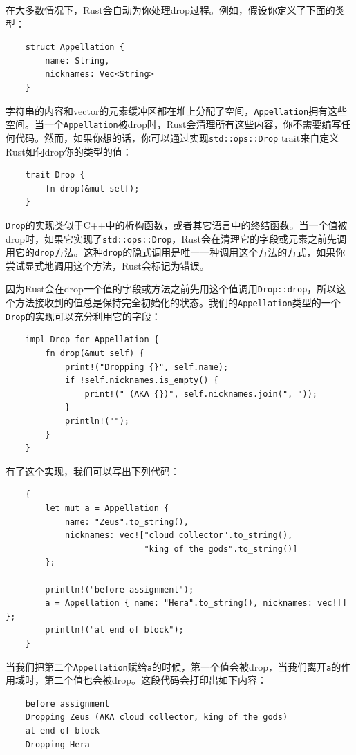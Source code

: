 在大多数情况下，Rust会自动为你处理drop过程。例如，假设你定义了下面的类型：
\begin{verbatim}
    struct Appellation {
        name: String,
        nicknames: Vec<String>
    }
\end{verbatim}

字符串的内容和vector的元素缓冲区都在堆上分配了空间，\texttt{Appellation}拥有这些空间。当一个\texttt{Appellation}被drop时，Rust会清理所有这些内容，你不需要编写任何代码。然而，如果你想的话，你可以通过实现\texttt{std::ops::Drop} trait来自定义Rust如何drop你的类型的值：
\begin{verbatim}
    trait Drop {
        fn drop(&mut self);
    }
\end{verbatim}

\texttt{Drop}的实现类似于C++中的析构函数，或者其它语言中的终结函数。当一个值被drop时，如果它实现了\texttt{std::ops::Drop}，Rust会在清理它的字段或元素之前先调用它的\texttt{drop}方法。这种\texttt{drop}的隐式调用是唯一一种调用这个方法的方式，如果你尝试显式地调用这个方法，Rust会标记为错误。

因为Rust会在drop一个值的字段或方法之前先用这个值调用\texttt{Drop::drop}，所以这个方法接收到的值总是保持完全初始化的状态。我们的\texttt{Appellation}类型的一个\texttt{Drop}的实现可以充分利用它的字段：
\begin{verbatim}
    impl Drop for Appellation {
        fn drop(&mut self) {
            print!("Dropping {}", self.name);
            if !self.nicknames.is_empty() {
                print!(" (AKA {})", self.nicknames.join(", "));
            }
            println!("");
        }
    }
\end{verbatim}

有了这个实现，我们可以写出下列代码：
\begin{verbatim}
    {
        let mut a = Appellation {
            name: "Zeus".to_string(),
            nicknames: vec!["cloud collector".to_string(),
                            "king of the gods".to_string()]
        };

        println!("before assignment");
        a = Appellation { name: "Hera".to_string(), nicknames: vec![] };
        println!("at end of block");
    }
\end{verbatim}

当我们把第二个\texttt{Appellation}赋给\texttt{a}的时候，第一个值会被drop，当我们离开\texttt{a}的作用域时，第二个值也会被drop。这段代码会打印出如下内容：
\begin{verbatim}
    before assignment
    Dropping Zeus (AKA cloud collector, king of the gods)
    at end of block
    Dropping Hera
\end{verbatim}

